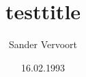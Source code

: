 \documentclass[paper=a4]{scrbook}
\begin{document}
\title{testtitle}
\author{Sander Vervoort}
\date{16.02.1993}
\maketitle
\end{document}
